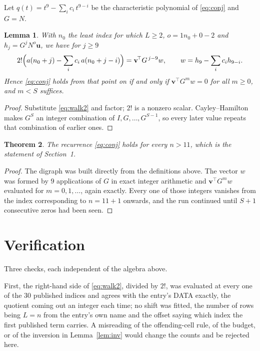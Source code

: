 \documentclass[11pt,a4paper]{article}
\theoremstyle{plain}
\newtheorem{theorem}{Theorem}
\newtheorem{lemma}[theorem]{Lemma}
\theoremstyle{definition}
\begin{document}
Let $q(t)=t^{9}-\sum_i c_i\,t^{9-i}$ be the characteristic polynomial of
\eqref{eq:conj} and $G=N$.

\begin{lemma}\label{lem:crit}
With $n_0$ the least index for which $L\ge2$, $o=1n_0+0-2$ and
$h_j=G^{j}N^{o}\mathbf{u}$, we have for $j\ge9$
\[
2!\Bigl(a(n_0+j)-\sum_i c_i\,a(n_0+j-i)\Bigr)=\mathbf{v}^{\!\top}G^{\,j-9}w,
\qquad w=h_{9}-\sum_i c_i h_{9-i} .
\]
Hence \eqref{eq:conj} holds from that point on if and only if
$\mathbf{v}^{\!\top}G^{m}w=0$ for all $m\ge0$, and $m<S$ suffices.
\end{lemma}

\begin{proof}
Substitute \eqref{eq:walk2} and factor; $2!$ is a nonzero scalar. Cayley--Hamilton
makes $G^{S}$ an integer combination of $I,G,\dots,G^{S-1}$, so every later value repeats
that combination of earlier ones.
\end{proof}

\begin{theorem}
The recurrence \eqref{eq:conj} holds for every $n>11$, which is the statement of
Section~1.
\end{theorem}

\begin{proof}
The digraph was built directly from the definitions above. The vector $w$ was formed by
$9$ applications of $G$ in exact integer arithmetic and $\mathbf{v}^{\!\top}G^{m}w$
evaluated for $m=0,1,\dots$, again exactly. Every one of those integers vanishes from the
index corresponding to $n=11+1$ onwards, and the run continued until $S+1$ consecutive
zeros had been seen.
\end{proof}

\section{Verification}

Three checks, each independent of the algebra above.

First, the right-hand side of \eqref{eq:walk2}, divided by $2!$, was evaluated at every
one of the $30$ published indices and agrees with the entry's DATA exactly, the quotient
coming out an integer each time; no shift was fitted, the number of rows being
$L=n$ from the entry's own name and the offset saying which index the first published
term carries. A misreading of the offending-cell rule, of the budget, or of the inversion in
Lemma~\ref{lem:inv} would change the counts and be rejected here.
\end{document}
